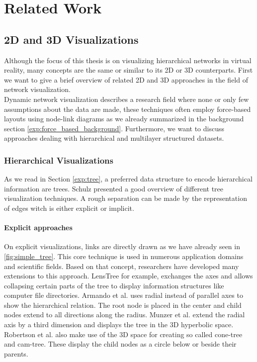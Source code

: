 \chapter{Related Work}

\section{2D and 3D Visualizations}

Although the focus of this thesis is on visualizing hierarchical networks in virtual reality, many concepts are the same or similar to its 2D or 3D counterparts. First we want to give a brief overview of related 2D and 3D approaches in the field of network visualization.\\
Dynamic network visualization describes a research field where none or only few assumptions about the data are made, these techniques often employ force-based layouts using node-link diagrams as we already summarized in the background section \ref{exp:force_based_background}. Furthermore, we want to discuss approaches dealing with hierarchical and multilayer structured datasets.

\subsection{Hierarchical Visualizations}

As we read in Section \ref{exp:tree}, a preferred data structure to encode hierarchical information are trees.
Schulz \cite{schulz_treevisnet_2011} presented a good overview of different tree visualization techniques. A rough separation can be made by the representation of edges witch is either explicit or implicit. 

\subsubsection{Explicit approaches}
On explicit visualizations, links are directly drawn as we have already seen in \ref{fig:simple_tree}. This core technique is used in numerous application domains and scientific fields. Based on that concept, researchers have developed many extensions to this approach.
LensTree \cite{song_lenstree_2006} for example, exchanges the axes and allows collapsing certain parts of the tree to display information structures like computer file directories. 
Armando et al. \cite{arce-orozco_radial_2017} uses radial instead of parallel axes to show the hierarchical relation. The root node is placed in the center and child nodes extend to all directions along the radius.
Munzer et al. \cite{munzner_h3_1997} extend the radial axis by a third dimension and displays the tree in the 3D hyperbolic space.
Robertson et al. \cite{robertson_cone_1991} also make use of the 3D space for creating so called cone-tree and cam-tree. These display the child nodes as a circle below or beside their parents.  

